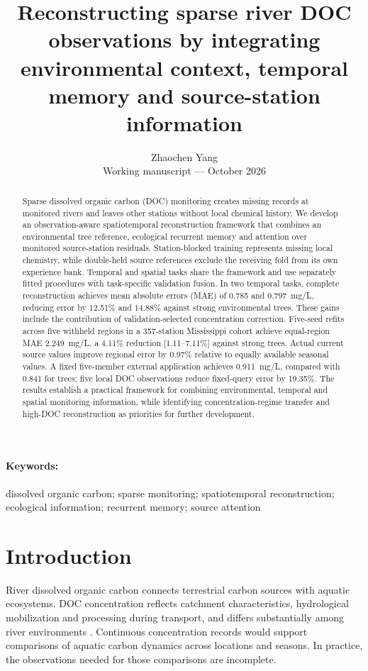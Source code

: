 \documentclass[11pt]{article}
\title{Reconstructing sparse river DOC observations by integrating environmental context, temporal memory and source-station information}
\author{Zhaochen Yang\\[2pt]\small Working manuscript --- October 2026}
\date{}
\begin{document}
\maketitle

\begin{abstract}
Sparse dissolved organic carbon (DOC) monitoring creates missing records at monitored rivers and leaves other stations without local chemical history. We develop an observation-aware spatiotemporal reconstruction framework that combines an environmental tree reference, ecological recurrent memory and attention over monitored source-station residuals. Station-blocked training represents missing local chemistry, while double-held source references exclude the receiving fold from its own experience bank. Temporal and spatial tasks share the framework and use separately fitted procedures with task-specific validation fusion. In two temporal tasks, complete reconstruction achieves mean absolute errors (MAE) of 0.785 and 0.797~mg/L, reducing error by 12.51\% and 14.88\% against strong environmental trees. These gains include the contribution of validation-selected concentration correction. Five-seed refits across five withheld regions in a 357-station Mississippi cohort achieve equal-region MAE 2.249~mg/L, a 4.11\% reduction [1.11--7.11\%] against strong trees. Actual current source values improve regional error by 0.97\% relative to equally available seasonal values. A fixed five-member external application achieves 0.911~mg/L, compared with 0.841 for trees; five local DOC observations reduce fixed-query error by 19.35\%. The results establish a practical framework for combining environmental, temporal and spatial monitoring information, while identifying concentration-regime transfer and high-DOC reconstruction as priorities for further development.
\end{abstract}
\paragraph{Keywords:} dissolved organic carbon; sparse monitoring; spatiotemporal reconstruction; ecological information; recurrent memory; source attention

\section{Introduction}
River dissolved organic carbon connects terrestrial carbon sources with aquatic ecosystems. DOC concentration reflects catchment characteristics, hydrological mobilization and processing during transport, and differs substantially among river environments \citep{yang2017}. Continuous concentration records would support comparisons of aquatic carbon dynamics across locations and seasons. In practice, the observations needed for those comparisons are incomplete.
\end{document}
